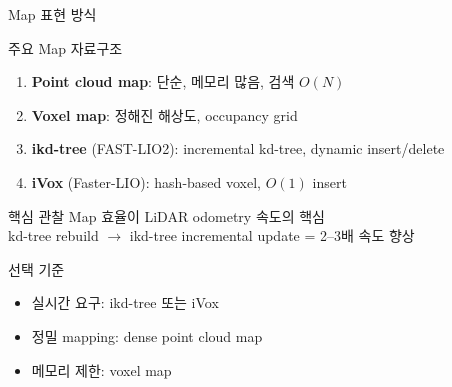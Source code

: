 \begin{frame}{Map 표현 방식}
  \begin{block}{주요 Map 자료구조}
    \begin{enumerate}
      \item \textbf{Point cloud map}: 단순, 메모리 많음, 검색 $O(N)$
      \item \textbf{Voxel map}: 정해진 해상도, occupancy grid
      \item \textbf{ikd-tree} (FAST-LIO2): incremental kd-tree, dynamic insert/delete
      \item \textbf{iVox} (Faster-LIO): hash-based voxel, $O(1)$ insert
    \end{enumerate}
  \end{block}
  \pause
  \begin{alertblock}{핵심 관찰}
    Map 효율이 LiDAR odometry 속도의 핵심\\
    kd-tree rebuild $\to$ ikd-tree incremental update = 2--3배 속도 향상
  \end{alertblock}
  \pause
  \begin{exampleblock}{선택 기준}
    \begin{itemize}
      \item 실시간 요구: ikd-tree 또는 iVox
      \item 정밀 mapping: dense point cloud map
      \item 메모리 제한: voxel map
    \end{itemize}
  \end{exampleblock}
\end{frame}

